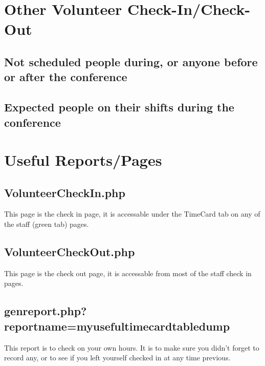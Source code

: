 \documentclass[captions=tablesignature]{scrartcl}
\begin{document}
\section{Other Volunteer Check-In/Check-Out}
\label{sec-3}
\subsection{Not scheduled people during, or anyone before or after the conference}
\label{sec-3-1}
\subsection{Expected people on their shifts during the conference}
\label{sec-3-2}

\section{Useful Reports/Pages}
\label{sec-4}
\subsection{VolunteerCheckIn.php}
\label{sec-4-1}
\label{VolunteerCheckIn.php}
This page is the check in page, it is accessable under the TimeCard
tab on any of the staff (green tab) pages.

\subsection{VolunteerCheckOut.php}
\label{sec-4-2}
\label{VolunteerCheckOut.php}
This page is the check out page, it is accessable from most of the
staff check in pages.

\subsection{genreport.php?reportname=myusefultimecardtabledump}
\label{sec-4-3}
\label{genreport.php?reportname=myusefultimecardtabledump}
This report is to check on your own hours.  It is to make sure you
didn't forget to record any, or to see if you left yourself checked
in at any time previous.
\end{document}

